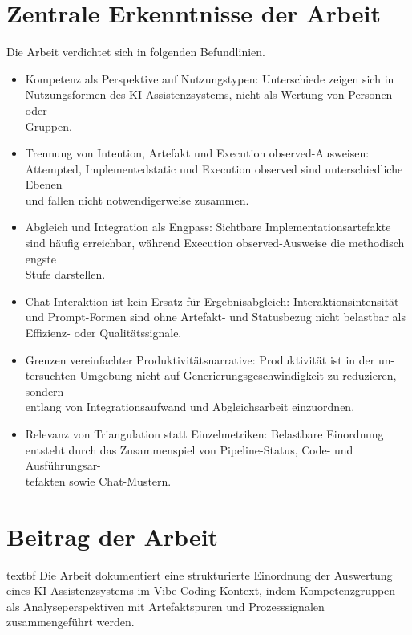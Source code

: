 \section{Zentrale Erkenntnisse der Arbeit}
Die Arbeit verdichtet sich in folgenden Befundlinien.
\begin{itemize}
    \item Kompetenz als Perspektive auf Nutzungstypen: Unterschiede zeigen sich in\\
    Nutzungsformen des KI-Assistenzsystems, nicht als Wertung von Personen oder\\
    Gruppen.
    \item Trennung von Intention, Artefakt und Execution observed-Ausweisen:\\
    Attempted, Implementedstatic und Execution observed sind unterschiedliche Ebenen\\
    und fallen nicht notwendigerweise zusammen.
    \item Abgleich und Integration als Engpass: Sichtbare Implementationsartefakte\\
    sind häufig erreichbar, während Execution observed-Ausweise die methodisch engste\\
    Stufe darstellen.
    \item Chat-Interaktion ist kein Ersatz für Ergebnisabgleich: Interaktionsintensität\\
    und Prompt-Formen sind ohne Artefakt- und Statusbezug nicht belastbar als\\
    Effizienz- oder Qualitätssignale.
    \item Grenzen vereinfachter Produktivitätsnarrative: Produktivität ist in der un-\\
    tersuchten Umgebung nicht auf Generierungsgeschwindigkeit zu reduzieren, sondern\\
    entlang von Integrationsaufwand und Abgleichsarbeit einzuordnen.
    \item Relevanz von Triangulation statt Einzelmetriken: Belastbare Einordnung\\
    entsteht durch das Zusammenspiel von Pipeline-Status, Code- und Ausführungsar-\\
    tefakten sowie Chat-Mustern.
\end{itemize}

\section{Beitrag der Arbeit}
\noindent \csname textbf Die Arbeit dokumentiert eine strukturierte Einordnung der Auswertung eines KI-Assistenzsystems im Vibe-Coding-Kontext, indem Kompetenzgruppen als Analyseperspektiven mit Artefaktspuren und Prozesssignalen zusammengeführt werden.

